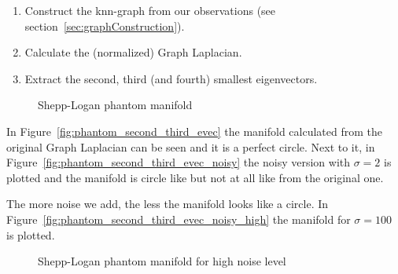 \begin{enumerate}
    \item Construct the knn-graph from our observations (see section~\ref{sec:graphConstruction}).
    \item Calculate the (normalized) Graph Laplacian.
    \item Extract the second, third (and fourth) smallest eigenvectors.
\end{enumerate}

\begin{figure}[H]
    \centering
    \caption{Shepp-Logan phantom manifold}
\end{figure}

In Figure~\ref{fig:phantom_second_third_evec} the manifold calculated from the original Graph Laplacian
can be seen and it is a perfect circle. Next to it, in Figure~\ref{fig:phantom_second_third_evec_noisy}
the noisy version with $\sigma=2$ is plotted and the manifold is circle like but not at all like from the original one.

The more noise we add, the less the manifold looks like a circle. In Figure~\ref{fig:phantom_second_third_evec_noisy_high}
the manifold for $\sigma=100$ is plotted.

\begin{figure}[H]
    \centering
    \caption{Shepp-Logan phantom manifold for high noise level}
\end{figure}

